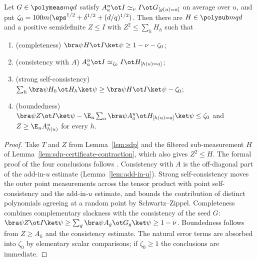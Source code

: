 \begin{lemma}\label{lem:self-improvement-helper}
	\leanok
	Let $G\in\polymeas mqd$ satisfy
	$A^u_a\ot I\simeq_\nu I\ot G_{[g(u)=a]}$ on average over $u$, and put
	$\zeta_0=100m(\eps^{1/2}+\delta^{1/2}+(d/q)^{1/2})$.  Then there are
	$H\in\polysub mqd$ and a positive semidefinite $Z\le I$ with
	$Z^2\le\sum_hH_h$ such that
	\begin{enumerate}
		\item (completeness) $\bra\psi H\ot I\ket\psi\ge1-\nu-\zeta_0$;
		\item (consistency with $A$) $A^u_a\ot I\simeq_{\zeta_0}I\ot H_{[h(u)=a]}$;
		\item (strong self-consistency)
		      $\sum_h\bra\psi H_h\ot H_h\ket\psi\ge\bra\psi H\ot I\ket\psi-\zeta_0$;
		\item (boundedness)
		      $\bra\psi Z\ot I\ket\psi-\E_u\sum_a\bra\psi A^u_a\ot H_{[h(u)=a]}\ket\psi\le\zeta_0$
		      and $Z\ge\E_uA^u_{h(u)}$ for every $h$.
	\end{enumerate}
\end{lemma}
\begin{proof}
	\leanok
	Take $T$ and $Z$ from Lemma~\ref{lem:sdp} and the filtered
	sub-measurement $H$ of Lemma~\ref{lem:sdp-certificate-contraction}, which
	also gives $Z^2\le H$.  The formal proof of the four conclusions follows
	\cite{Ji2020LowIndividualDegree}.  Consistency with $A$ is the
	off-diagonal part of the add-in-$u$ estimate
	(Lemma~\ref{lem:add-in-u}).  Strong self-consistency moves the outer
	point measurements across the tensor product with point self-consistency
	and the add-in-$u$ estimate, and bounds the contribution of distinct
	polynomials agreeing at a random point by Schwartz--Zippel.  Completeness
	combines complementary slackness with the consistency of the seed $G$:
	$\bra\psi Z\ot I\ket\psi\ge\sum_g\bra\psi A_g\ot G_g\ket\psi\ge1-\nu$.
	Boundedness follows from $Z\ge A_h$ and the consistency estimate.  The
	natural error terms are absorbed into $\zeta_0$ by elementary scalar
	comparisons; if $\zeta_0\ge1$ the conclusions are immediate.
\end{proof}


